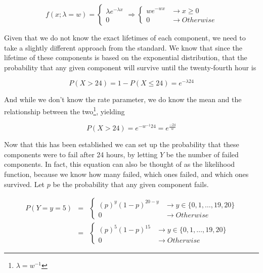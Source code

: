 \documentclass[10pt]{article}
\begin{document}
\begin{easylist}[enumerate]
    \[
        f(x; \lambda=w) =
        \begin{cases}
            \lambda e^{-\lambda x}\\
            0
        \end{cases} \Rightarrow
        \begin{cases}
            w e^{-w x} &\to x \ge 0\\
            0 &\to Otherwise
        \end{cases}
    \]

    Given that we do not know the exact lifetimes of each component, we need to take a slightly different approach from
    the standard. We know that since the lifetime of these components is based on the exponential distribution, that the
    probability that any given component will survive until the twenty-fourth hour is

    \[ P(X > 24) = 1 - P(X \le 24) = e^{-\lambda 24} \]

    And while we don't know the rate parameter, we do know the mean and the relationship between the
    two\footnote{$\lambda = w^{-1}$}, yielding

    \[ P(X > 24) = e^{-w^{-1} 24} = e^\frac{-24}{w} \]

    Now that this has been established we can set up the probability that these components were to fail after 24 hours,
    by letting $Y$ be the number of failed components. In fact, this equation can also be thought of as the likelihood
    function, because we know how many failed, which ones failed, and which ones survived. Let $p$ be the probability
    that any given component fails.

    \[
        \begin{aligned}
            P(Y=y=5) &=&
            \begin{cases}
                {\left( p \right)}^y
                    {\left( 1 - p \right)}^{20-y} &\to y \in \{0, 1, \ldots, 19, 20\}\\
                0 &\to Otherwise
            \end{cases}\\
            &=& \begin{cases}
                {\left( p \right)}^5
                    {\left( 1 - p\right)}^{15} &\to y \in \{0, 1, \ldots, 19, 20\}\\
                0 &\to Otherwise
            \end{cases}
        \end{aligned}
    \]


\end{easylist}
\end{document}
